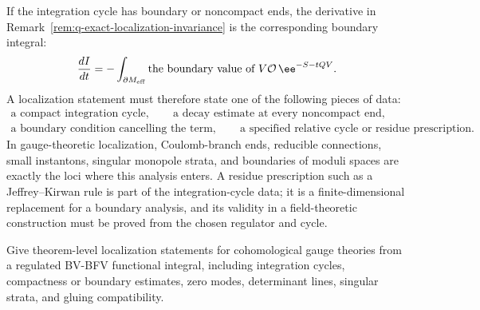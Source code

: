 If the integration cycle has boundary or noncompact ends, the derivative in
Remark~\ref{rem:q-exact-localization-invariance} is the corresponding
boundary integral:
\[
  \frac{dI}{dt}
  =
  -\int_{\partial M_{\rm eff}}
  \text{the boundary value of }V\mathcal O\,\ee^{-S-tQV}.
\]
A localization statement must therefore state one of the following pieces of
data:
\[
\begin{gathered}
  \text{a compact integration cycle},\qquad
  \text{a decay estimate at every noncompact end},\\
  \text{a boundary condition cancelling the term},\qquad
  \text{a specified relative cycle or residue prescription}.
\end{gathered}
\]
In gauge-theoretic localization, Coulomb-branch ends, reducible connections,
small instantons, singular monopole strata, and boundaries of moduli spaces
are exactly the loci where this analysis enters.  A residue prescription such
as a Jeffrey--Kirwan rule is part of the integration-cycle data; it is a
finite-dimensional replacement for a boundary analysis, and its validity in a
field-theoretic construction must be proved from the chosen regulator and
cycle.

\begin{openproblem}
\label{op:infinite-dimensional-bv-localization}
Give theorem-level localization statements for cohomological gauge theories
from a regulated BV-BFV functional integral, including integration cycles,
compactness or boundary estimates, zero modes, determinant lines, singular
strata, and gluing compatibility.
\end{openproblem}
